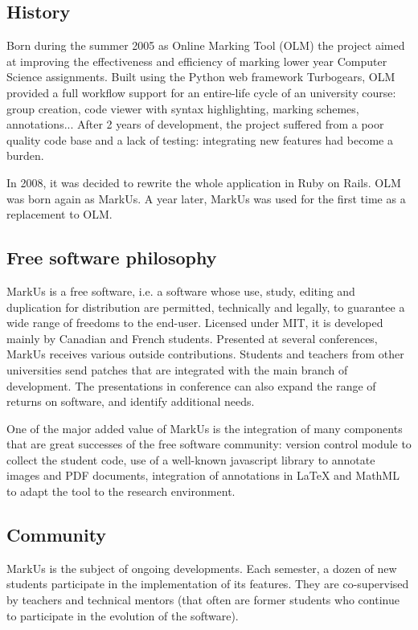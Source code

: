 \documentclass[twocolumn,10pt]{asme2e}
\begin{document}

\subsection*{History}

Born during the summer 2005 as Online Marking Tool (OLM) the project aimed at
improving the effectiveness and efficiency of marking lower year Computer
Science assignments. Built using the Python web framework Turbogears, OLM
provided a full workflow support for an entire-life cycle of an university
course: group creation, code viewer with syntax highlighting, marking schemes,
annotations... After 2 years of development, the project suffered from a poor
quality code base and a lack of testing: integrating new features had become a
burden.

In 2008, it was decided to rewrite the whole application in Ruby on Rails. OLM
was born again as MarkUs. A year later, MarkUs was used for the first time as
a replacement to OLM.

\subsection*{Free software philosophy}
MarkUs is a free software, i.e. a software whose use, study, editing and duplication for distribution are permitted, technically and legally, to guarantee a wide range of freedoms to the end-user. Licensed under MIT, it is developed mainly by Canadian and French students.
Presented at several conferences, MarkUs receives various outside contributions. Students and teachers from other universities send patches that are integrated with the main branch of development. The presentations in conference can also expand the range of returns on software, and identify additional needs.

One of the major added value of MarkUs is the integration of many components that are great successes of the free software community: version control module to collect the student code, use of a well-known javascript library to annotate images and PDF documents, integration of annotations in LaTeX and MathML to adapt the tool to the research environment. 

\subsection*{Community}
MarkUs is the subject of ongoing developments. Each semester, a dozen of new students participate in the implementation of its features. They are co-supervised by teachers and technical mentors (that often are former students who continue to participate in the evolution of the software).
\end{document}
